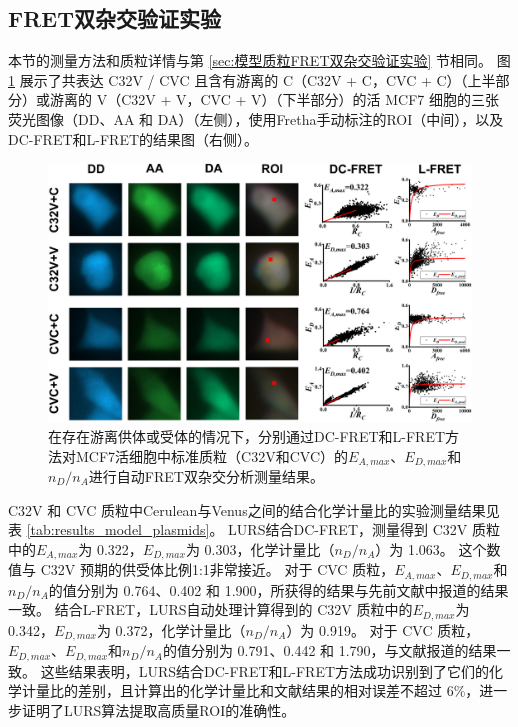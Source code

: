 \subsection{FRET双杂交验证实验}
本节的测量方法和质粒详情与第 \ref{sec:模型质粒FRET双杂交验证实验} 节相同。
图 \ref{fig:results_model_plasmids} 展示了共表达 C32V / CVC 且含有游离的 C（C32V + C，CVC + C）（上半部分）或游离的 V（C32V + V，CVC + V）（下半部分）的活 MCF7 细胞的三张荧光图像（DD、AA 和 DA）（左侧），使用Fretha手动标注的ROI（中间），以及DC-FRET和L-FRET的结果图（右侧）。
\begin{figure}[htbp]
    \centering
    \includegraphics[width=1\linewidth]{../figures/3/LURS模型质粒双杂交.png}
    \caption[模型质粒验证实验结果]{在存在游离供体或受体的情况下，分别通过DC-FRET和L-FRET方法对MCF7活细胞中标准质粒（C32V和CVC）的$E_{A, max}$、$E_{D, max}$和$n_D/n_A$进行自动FRET双杂交分析测量结果。}
    \label{fig:results_model_plasmids}
\end{figure}

C32V 和 CVC 质粒中Cerulean与Venus之间的结合化学计量比的实验测量结果见表 \ref{tab:results_model_plasmids}。
LURS结合DC-FRET，测量得到 C32V 质粒中的$E_{A,max}$为 0.322，$E_{D,max}$为 0.303，化学计量比（$n_D/n_A$）为 1.063。
这个数值与 C32V 预期的供受体比例1:1非常接近。
对于 CVC 质粒，$E_{A,max}$、$E_{D,max}$和$n_D/n_A$的值分别为 0.764、0.402 和 1.900，所获得的结果与先前文献中报道的结果一致。
结合L-FRET，LURS自动处理计算得到的 C32V 质粒中的$E_{D,max}$为 0.342，$E_{D,max}$为 0.372，化学计量比（$n_D/n_A$）为 0.919。
对于 CVC 质粒，$E_{D,max}$、$E_{D,max}$和$n_D/n_A$的值分别为 0.791、0.442 和 1.790，与文献报道的结果一致。
这些结果表明，LURS结合DC-FRET和L-FRET方法成功识别到了它们的化学计量比的差别，且计算出的化学计量比和文献结果的相对误差不超过 6\%，进一步证明了LURS算法提取高质量ROI的准确性。

